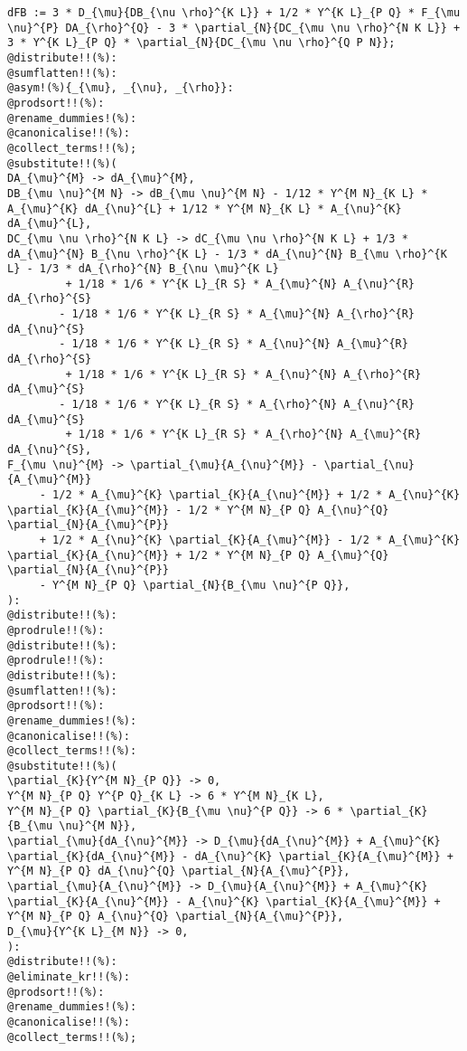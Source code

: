 \documentclass[11pt]{article}
\begin{document}
{\color[named]{Blue}\begin{verbatim}
dFB := 3 * D_{\mu}{DB_{\nu \rho}^{K L}} + 1/2 * Y^{K L}_{P Q} * F_{\mu \nu}^{P} DA_{\rho}^{Q} - 3 * \partial_{N}{DC_{\mu \nu \rho}^{N K L}} + 3 * Y^{K L}_{P Q} * \partial_{N}{DC_{\mu \nu \rho}^{Q P N}};
@distribute!!(%):
@sumflatten!!(%):
@asym!(%){_{\mu}, _{\nu}, _{\rho}}:
@prodsort!!(%):
@rename_dummies!(%):
@canonicalise!!(%):
@collect_terms!!(%);
@substitute!!(%)(
DA_{\mu}^{M} -> dA_{\mu}^{M},
DB_{\mu \nu}^{M N} -> dB_{\mu \nu}^{M N} - 1/12 * Y^{M N}_{K L} * A_{\mu}^{K} dA_{\nu}^{L} + 1/12 * Y^{M N}_{K L} * A_{\nu}^{K} dA_{\mu}^{L},
DC_{\mu \nu \rho}^{N K L} -> dC_{\mu \nu \rho}^{N K L} + 1/3 * dA_{\mu}^{N} B_{\nu \rho}^{K L} - 1/3 * dA_{\nu}^{N} B_{\mu \rho}^{K L} - 1/3 * dA_{\rho}^{N} B_{\nu \mu}^{K L}
         + 1/18 * 1/6 * Y^{K L}_{R S} * A_{\mu}^{N} A_{\nu}^{R} dA_{\rho}^{S}
        - 1/18 * 1/6 * Y^{K L}_{R S} * A_{\mu}^{N} A_{\rho}^{R} dA_{\nu}^{S}
        - 1/18 * 1/6 * Y^{K L}_{R S} * A_{\nu}^{N} A_{\mu}^{R} dA_{\rho}^{S}
         + 1/18 * 1/6 * Y^{K L}_{R S} * A_{\nu}^{N} A_{\rho}^{R} dA_{\mu}^{S}
        - 1/18 * 1/6 * Y^{K L}_{R S} * A_{\rho}^{N} A_{\nu}^{R} dA_{\mu}^{S}
         + 1/18 * 1/6 * Y^{K L}_{R S} * A_{\rho}^{N} A_{\mu}^{R} dA_{\nu}^{S},
F_{\mu \nu}^{M} -> \partial_{\mu}{A_{\nu}^{M}} - \partial_{\nu}{A_{\mu}^{M}} 
     - 1/2 * A_{\mu}^{K} \partial_{K}{A_{\nu}^{M}} + 1/2 * A_{\nu}^{K} \partial_{K}{A_{\mu}^{M}} - 1/2 * Y^{M N}_{P Q} A_{\nu}^{Q} \partial_{N}{A_{\mu}^{P}}
     + 1/2 * A_{\nu}^{K} \partial_{K}{A_{\mu}^{M}} - 1/2 * A_{\mu}^{K} \partial_{K}{A_{\nu}^{M}} + 1/2 * Y^{M N}_{P Q} A_{\mu}^{Q} \partial_{N}{A_{\nu}^{P}}
     - Y^{M N}_{P Q} \partial_{N}{B_{\mu \nu}^{P Q}},
):
@distribute!!(%):
@prodrule!!(%):
@distribute!!(%):
@prodrule!!(%):
@distribute!!(%):
@sumflatten!!(%):
@prodsort!!(%):
@rename_dummies!(%):
@canonicalise!!(%):
@collect_terms!!(%):
@substitute!!(%)(
\partial_{K}{Y^{M N}_{P Q}} -> 0,
Y^{M N}_{P Q} Y^{P Q}_{K L} -> 6 * Y^{M N}_{K L},
Y^{M N}_{P Q} \partial_{K}{B_{\mu \nu}^{P Q}} -> 6 * \partial_{K}{B_{\mu \nu}^{M N}},
\partial_{\mu}{dA_{\nu}^{M}} -> D_{\mu}{dA_{\nu}^{M}} + A_{\mu}^{K} \partial_{K}{dA_{\nu}^{M}} - dA_{\nu}^{K} \partial_{K}{A_{\mu}^{M}} + Y^{M N}_{P Q} dA_{\nu}^{Q} \partial_{N}{A_{\mu}^{P}},
\partial_{\mu}{A_{\nu}^{M}} -> D_{\mu}{A_{\nu}^{M}} + A_{\mu}^{K} \partial_{K}{A_{\nu}^{M}} - A_{\nu}^{K} \partial_{K}{A_{\mu}^{M}} + Y^{M N}_{P Q} A_{\nu}^{Q} \partial_{N}{A_{\mu}^{P}},
D_{\mu}{Y^{K L}_{M N}} -> 0,
):
@distribute!!(%):
@eliminate_kr!!(%):
@prodsort!!(%):
@rename_dummies!(%):
@canonicalise!!(%):
@collect_terms!!(%);
\end{verbatim}}
\end{document}
